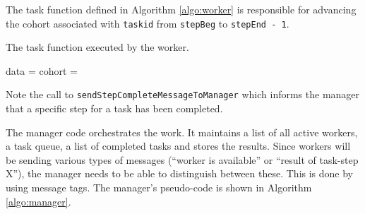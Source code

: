 \documentclass[a4paper,oneside,12pt]{article}
\begin{document}
The task function defined in Algorithm \ref{algo:worker} is responsible for advancing the cohort associated with \verb|taskid| from \verb|stepBeg| to \verb|stepEnd - 1|.
\begin{algorithm}
\caption{The task function executed by the worker.}
    \begin{algorithmic}[1] %
    \State data = 
    \State cohort = 
        \State {}
        \State {}
    \EndFor
\EndFunction
\end{algorithmic}
\label{algo:task}
\end{algorithm}
Note the call to \verb|sendStepCompleteMessageToManager| which informs the manager that a specific step for a task has been completed. 

The manager code orchestrates the work. It maintains a list of all active workers, a task queue, a list of completed tasks and stores the results. 
Since workers will be sending various types of messages (``worker is available'' or ``result of task-step X''), the manager needs to be able to 
distinguish between these. This is done by using message tags.
The manager's pseudo-code is shown in Algorithm \ref{algo:manager}.
\end{document}

